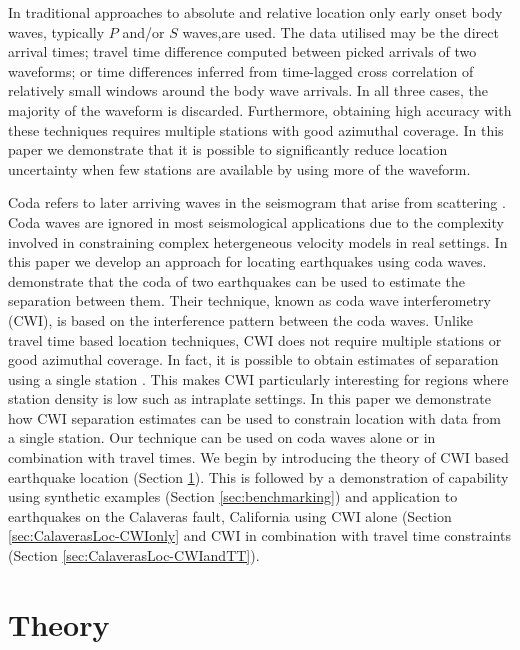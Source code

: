 \documentclass[extra, onecolumn, doublespacing]{gji}
\begin{document}
In traditional approaches to absolute and relative location only
early onset body waves, typically $P$ and/or $S$ waves,are used. The
data utilised may be the direct arrival times; travel time
difference computed between picked arrivals of two waveforms; or
time differences inferred from time-lagged cross correlation of
relatively small windows around the body wave arrivals.
 In all three cases, the majority of the
waveform is discarded. Furthermore, obtaining high accuracy with these techniques
requires multiple stations with good azimuthal coverage.
In this paper we demonstrate that it is possible to
significantly reduce location uncertainty when few stations are
available by using more of the waveform.

Coda refers to  later arriving waves in the seismogram that arise
from scattering  \citep{dr_Aki69a,dr_Snieder99a,dr_Snieder06a}. Coda
waves are ignored in most seismological applications due to the
complexity involved in constraining complex hetergeneous velocity models
in real settings. In this paper we
develop an approach for locating earthquakes using coda waves.
\citet{dr_Snieder05a} demonstrate that the coda of two earthquakes
can be used to estimate the separation between them. Their
technique, known as coda wave interferometry (CWI), is based on the
interference pattern between the coda waves. Unlike travel time
based location techniques, CWI
 does not require multiple stations or good azimuthal coverage.
In fact, it is possible to obtain estimates of separation using a single
station \citep{dr_Robinson07b}. This makes CWI particularly interesting
for regions where station density is low such as intraplate settings. In this
paper we demonstrate how CWI separation estimates can be used to constrain
location with data from a single station.
Our technique can be used on coda waves alone or in combination with
travel times. We begin by introducing the theory of CWI based earthquake location
(Section \ref{sec:theory}). This is followed by a demonstration of capability using
synthetic examples (Section \ref{sec:benchmarking}) and application to earthquakes
on the Calaveras fault, California using CWI alone (Section \ref{sec:CalaverasLoc-CWIonly}
and CWI in combination with travel time constraints (Section \ref{sec:CalaverasLoc-CWIandTT}).

\section{Theory}
\label{sec:theory}
\end{document}
